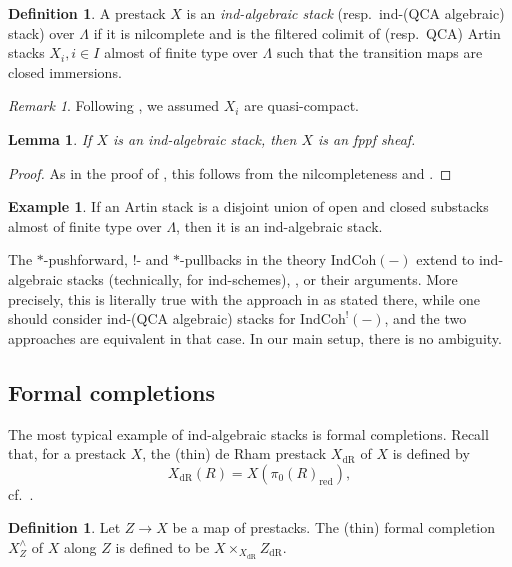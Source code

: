 \documentclass{amsart}
\newtheorem{lemma}[theorem]{Lemma}
\theoremstyle{definition}
\newtheorem{definition}[theorem]{Definition}
\newtheorem{example}[theorem]{Example}
\theoremstyle{remark}
\newtheorem{remark}[theorem]{Remark}
\numberwithin{equation}{section}
\newcommand{\IndCoh}{\mathrm{IndCoh}}
\newcommand{\red}{\mathrm{red}}
\begin{document}
\begin{definition}
A prestack $X$ is an \emph{ind-algebraic stack} (resp.~ind-(QCA algebraic) stack) over $\Lambda$ if it is nilcomplete and is the filtered colimit of (resp.~QCA) Artin stacks $X_i, i\in I$ almost of finite type over $\Lambda$ such that the transition maps are closed immersions.  
\end{definition}

\begin{remark}
Following \cite[Definition 9.4]{ZhuTame}, we assumed $X_i$ are quasi-compact.  
\end{remark}

\begin{lemma}
If $X$ is an ind-algebraic stack, then $X$ is an fppf sheaf. 
\end{lemma}

\begin{proof}
As in the proof of \cite[Proposition 1.5.2]{GRInd}, this follows from the nilcompleteness and \cite[Lemma 1.3.3]{GRInd}. 
\end{proof}

\begin{example}
If an Artin stack is a disjoint union of open and closed substacks almost of finite type over $\Lambda$, then it is an ind-algebraic stack. 
\end{example}

The $*$-pushforward, $!$- and $*$-pullbacks in the theory $\IndCoh(-)$ extend to ind-algebraic stacks \cite{GRInd} (technically, for ind-schemes), \cite[Theorem 9.39]{ZhuTame}, or their arguments. More precisely, this is literally true with the approach in \cite{ZhuTame} as stated there, while one should consider ind-(QCA algebraic) stacks for $\IndCoh^!(-)$, and the two approaches are equivalent in that case. In our main setup, there is no ambiguity.  

\subsection{Formal completions}
The most typical example of ind-algebraic stacks is formal completions. Recall that, for a prestack $X$, the (thin) de Rham prestack $X_{\mathrm{dR}}$ of $X$ is defined by
\[
X_{\mathrm{dR}}(R)=X(\pi_0(R)_{\red}),  
\]
cf.~\cite[Definition 7.1.1]{ElmantoKubrakSosnilo}. 

\begin{definition}
Let $Z\to X$ be a map of prestacks. The (thin) formal completion $X^\wedge_Z$ of $X$ along $Z$ is defined to be $X\times_{X_\mathrm{dR}}Z_{\mathrm{dR}}$. 
\end{definition}
\end{document}
